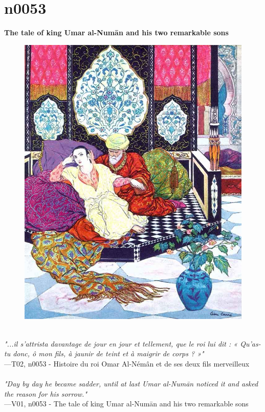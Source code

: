 \documentclass[../Carre_nights.tex]{subfiles}
\begin{document}
\newpage

\section{n0053}
\textbf{\Large{The tale of king Umar al-Num\=an and his two remarkable sons}} \\

\begin{figure}[ht]
\centering
\includegraphics[height=\figsize]{illustrations/volume_2/T02, n0053 - Histoire du roi Omar Al-Némân et de ses deux fils merveilleux.jpg}
\end{figure}

\textit{\\
"...il s’attrista davantage de jour en jour et tellement, que le roi lui dit : « Qu’as-tu donc, ô mon fils, à jaunir de teint et à maigrir de corps ? »"} \\
—T02, n0053 - Histoire du roi Omar Al-Némân et de ses deux fils merveilleux \\~\\
\textit{"Day by day he became sadder, until at last Umar al-Num\=an noticed it and asked the reason for his sorrow."} \\
—V01, n0053 - The tale of king Umar al-Num\=an and his two remarkable sons
\end{document}

